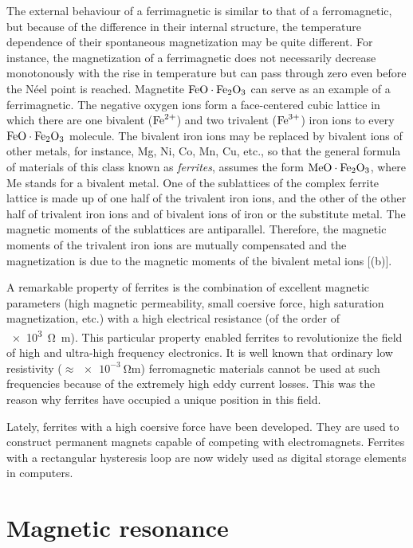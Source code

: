 The external behaviour of a ferrimagnetic is similar to that of a ferromagnetic, but because of the difference in their internal structure, the temperature dependence of their spontaneous magnetization may be quite different. For instance, the magnetization of a ferrimagnetic does not necessarily decrease monotonously with the rise in temperature but can pass through zero even before the N\'eel point is reached. Magnetite $\ce{FeO}\cdot\ce{Fe2O3}$ can serve as an example of a ferrimagnetic. The negative oxygen ions form a face-centered cubic lattice in which there are one bivalent ($\ce{Fe^2+}$) and two trivalent ($\ce{Fe^3+}$) iron ions to every $\ce{FeO}\cdot\ce{Fe2O3}$ molecule. The bivalent iron ions may be replaced by bivalent ions of other metals, for instance, Mg, Ni, Co, Mn, Cu, etc., so that the general formula of materials of this class known as \textit{ferrites}, assumes the form $\ce{MeO}\cdot\ce{Fe2O3}$, where Me stands for a bivalent metal. One of the sublattices of the complex ferrite lattice is made up of one half of the trivalent iron ions, and the other of the other
half of trivalent iron ions and of bivalent ions of iron or the substitute metal. The magnetic moments of the sublattices are antiparallel. Therefore, the magnetic moments of the trivalent iron ions are mutually compensated and the magnetization is due to the magnetic moments of the bivalent metal ions [(b)].

A remarkable property of ferrites is the combination of excellent magnetic parameters (high magnetic permeability, small coersive force, high saturation magnetization, etc.) with a high electrical resistance (of the order of \SI{e3}{\ohm\metre}). This particular property enabled ferrites to revolutionize the field of high and ultra-high frequency electronics. It is well known that ordinary low resistivity ($\approx\SI{e-3}{\ohm\metre}$) ferromagnetic materials cannot be used at such frequencies because of the extremely high eddy current losses. This was the reason why ferrites have occupied a unique position in this field.

Lately, ferrites with a high coersive force have been developed. They are used to construct permanent magnets capable of competing with electromagnets. Ferrites with a rectangular hysteresis loop are now widely used as digital storage elements in computers.

\section{Magnetic resonance}\label{sec:71}

